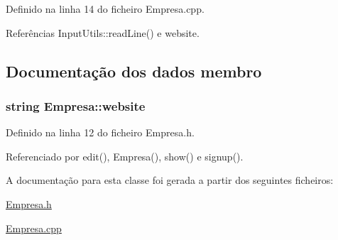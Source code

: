 Definido na linha 14 do ficheiro Empresa.\+cpp.



Referências Input\+Utils\+::read\+Line() e website.



\subsection{Documentação dos dados membro}
\hypertarget{class_empresa_a809624b98d1db18f8627ce2fa394dddd}{
\subsubsection[{website}]{\setlength{\rightskip}{0pt plus 5cm}string Empresa\+::website\hspace{0.3cm}{\ttfamily [private]}}}\label{class_empresa_a809624b98d1db18f8627ce2fa394dddd}


Definido na linha 12 do ficheiro Empresa.\+h.



Referenciado por edit(), Empresa(), show() e signup().



A documentação para esta classe foi gerada a partir dos seguintes ficheiros\+:\begin{DoxyCompactItemize}
\item 
\hyperlink{_empresa_8h}{Empresa.\+h}\item 
\hyperlink{_empresa_8cpp}{Empresa.\+cpp}\end{DoxyCompactItemize}
